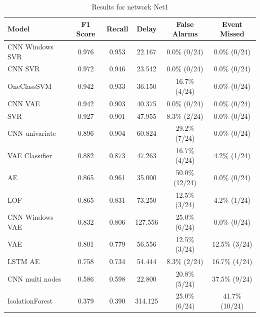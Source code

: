 \begin{table}
\caption{Results for network Net1}
\label{tab:results-Net1}
\begin{tabular}{lccccc}
\toprule
Model & F1 Score & Recall & Delay & False Alarms & Event Missed \\
\midrule
CNN Windows SVR & 0.976 & 0.953 & 22.167 & 0.0\% (0/24) & 0.0\% (0/24) \\
CNN SVR & 0.972 & 0.946 & 23.542 & 0.0\% (0/24) & 0.0\% (0/24) \\
OneClassSVM & 0.942 & 0.933 & 36.150 & 16.7\% (4/24) & 0.0\% (0/24) \\
CNN VAE & 0.942 & 0.903 & 40.375 & 0.0\% (0/24) & 0.0\% (0/24) \\
SVR & 0.927 & 0.901 & 47.955 & 8.3\% (2/24) & 0.0\% (0/24) \\
CNN univariate & 0.896 & 0.904 & 60.824 & 29.2\% (7/24) & 0.0\% (0/24) \\
VAE Classifier & 0.882 & 0.873 & 47.263 & 16.7\% (4/24) & 4.2\% (1/24) \\
AE & 0.865 & 0.961 & 35.000 & 50.0\% (12/24) & 0.0\% (0/24) \\
LOF & 0.865 & 0.831 & 73.250 & 12.5\% (3/24) & 4.2\% (1/24) \\
CNN Windows VAE & 0.832 & 0.806 & 127.556 & 25.0\% (6/24) & 0.0\% (0/24) \\
VAE & 0.801 & 0.779 & 56.556 & 12.5\% (3/24) & 12.5\% (3/24) \\
LSTM AE & 0.758 & 0.734 & 54.444 & 8.3\% (2/24) & 16.7\% (4/24) \\
CNN multi nodes & 0.586 & 0.598 & 22.800 & 20.8\% (5/24) & 37.5\% (9/24) \\
IsolationForest & 0.379 & 0.390 & 314.125 & 25.0\% (6/24) & 41.7\% (10/24) \\
\bottomrule
\end{tabular}
\end{table}
